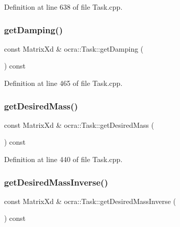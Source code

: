 Definition at line 638 of file Task.\+cpp.

\hypertarget{classocra_1_1Task_a2842e5002ee9a517125ef8f154697c1b}{}\label{classocra_1_1Task_a2842e5002ee9a517125ef8f154697c1b} 
\subsubsection{\texorpdfstring{get\+Damping()}{getDamping()}}
{\footnotesize\ttfamily const Matrix\+Xd \& ocra\+::\+Task\+::get\+Damping (\begin{DoxyParamCaption}{ }\end{DoxyParamCaption}) const}



Definition at line 465 of file Task.\+cpp.

\hypertarget{classocra_1_1Task_a691db27f3868220469a8ce15a6a15817}{}\label{classocra_1_1Task_a691db27f3868220469a8ce15a6a15817} 
\subsubsection{\texorpdfstring{get\+Desired\+Mass()}{getDesiredMass()}}
{\footnotesize\ttfamily const Matrix\+Xd \& ocra\+::\+Task\+::get\+Desired\+Mass (\begin{DoxyParamCaption}{ }\end{DoxyParamCaption}) const}



Definition at line 440 of file Task.\+cpp.

\hypertarget{classocra_1_1Task_ac6bca4c315c331f91dfc927aea4abbc2}{}\label{classocra_1_1Task_ac6bca4c315c331f91dfc927aea4abbc2} 
\subsubsection{\texorpdfstring{get\+Desired\+Mass\+Inverse()}{getDesiredMassInverse()}}
{\footnotesize\ttfamily const Matrix\+Xd \& ocra\+::\+Task\+::get\+Desired\+Mass\+Inverse (\begin{DoxyParamCaption}{ }\end{DoxyParamCaption}) const}



